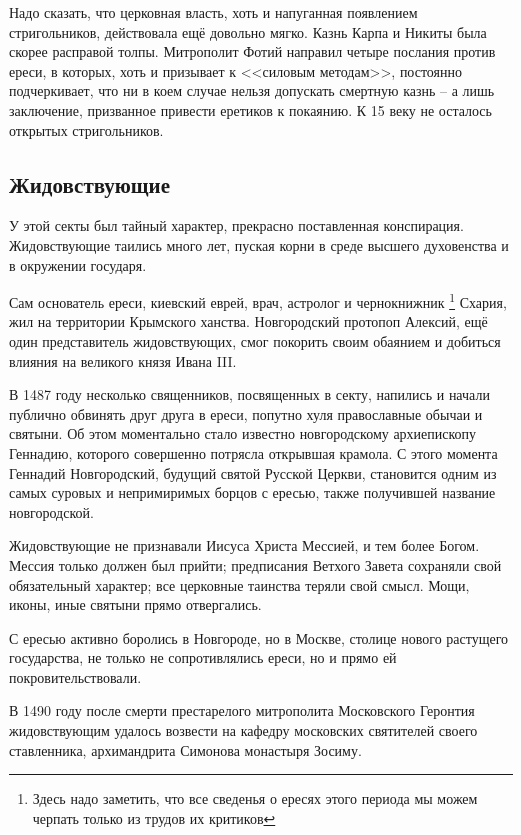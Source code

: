 \documentclass[12pt]{article}
\begin{document}
  Надо сказать, что церковная власть, хоть и напуганная появлением стригольников, действовала ещё довольно мягко.
  Казнь Карпа и Никиты была скорее расправой толпы.
  Митрополит Фотий направил четыре послания против ереси, в которых, хоть и призывает к <<силовым методам>>, постоянно подчеркивает,
  что ни в коем случае нельзя допускать смертную казнь -- а лишь заключение, призванное привести еретиков к покаянию.
  К 15 веку не осталось открытых стригольников.


  \subsection{Жидовствующие}
  У этой секты был тайный характер, прекрасно поставленная конспирация.
  Жидовствующие таились много лет, пуская корни в среде высшего духовенства и в окружении государя.

  Сам основатель ереси, киевский еврей, врач, астролог и чернокнижник%
  \footnote{Здесь надо заметить, что все сведенья о ересях этого периода мы можем черпать только из трудов их критиков}
  Схария, жил на территории Крымского ханства.
  Новгородский протопоп Алексий, ещё один представитель жидовствующих, смог покорить своим обаянием и добиться влияния на великого князя Ивана III.

  В 1487 году несколько священников, посвященных в секту, напились и начали публично обвинять друг друга в ереси,
  попутно хуля православные обычаи и святыни.
  Об этом моментально стало известно новгородскому архиепископу Геннадию, которого совершенно потрясла открывшая крамола.
  С этого момента Геннадий Новгородский, будущий святой Русской Церкви,
  становится одним из самых суровых и непримиримых борцов с ересью, также получившей название новгородской.

  Жидовствующие не признавали Иисуса Христа Мессией, и тем более Богом.
  Мессия только должен был прийти; предписания Ветхого Завета сохраняли свой обязательный характер;
  все церковные таинства теряли свой смысл.
  Мощи, иконы, иные святыни прямо отвергались.

  С ересью активно боролись в Новгороде,
  но в Москве, столице нового растущего государства, не только не сопротивлялись ереси, но и прямо ей покровительствовали.

  В 1490 году после смерти престарелого митрополита Московского Геронтия
  жидовствующим удалось возвести на кафедру московских святителей своего ставленника,
  архимандрита Симонова монастыря Зосиму.
\end{document}
